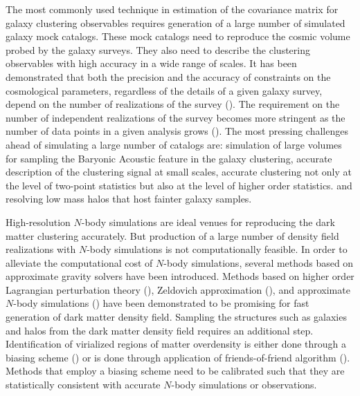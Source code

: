 The most commonly used technique in estimation of the covariance matrix for galaxy clustering observables requires generation of a large number of simulated galaxy mock catalogs. These mock catalogs need to reproduce the cosmic volume probed by the galaxy surveys. They also need to describe the clustering observables with high accuracy in a wide range of scales. It has been demonstrated that both the precision and the accuracy of constraints on the cosmological parameters, regardless of the details of a given galaxy survey, depend on the number of realizations of the survey (\citealt{dodelson2013,taylor2014}). The requirement on the number of independent realizations of the survey becomes more stringent as the number of data points in a given analysis grows (\citealt{taylor2013}).
The most pressing challenges ahead of simulating a large number of catalogs are: simulation of large volumes for sampling the Baryonic Acoustic feature in the galaxy clustering, accurate description of the clustering signal at small scales, accurate clustering not only at the level of two-point statistics but also at the level of higher order statistics.  and resolving low mass halos that host fainter galaxy samples.  

High-resolution $N$-body simulations are ideal venues for reproducing the dark matter clustering accurately. But production of a large number of density field realizations with $N$-body simulations is not computationally feasible. In order to alleviate the computational cost of $N$-body simulations, several methods based on approximate gravity solvers have been introduced. Methods based on higher order Lagrangian perturbation theory (\citealt{buchert1993,bouchet1995,catelan1995,monaco2002,scocci2002,alpt}), Zeldovich approximation (\citealt{eazymock}), and approximate $N$-body simulations (\citealt{cola2013,qpm,howlet2015,cola,fastpm,ice_cola,koda}) have been demonstrated to be promising for fast generation of dark matter density field. Sampling the structures such as galaxies and halos from the dark matter density field requires an additional step. Identification of virialized regions of matter overdensity is either done through a biasing scheme (\citealt{kitaura2014,qpm}) or is done through application of friends-of-friend algorithm (\citealt{pthalo,koda,fastpm}). Methods that employ a biasing scheme need to be calibrated such that they are statistically consistent with accurate $N$-body simulations or observations. 

